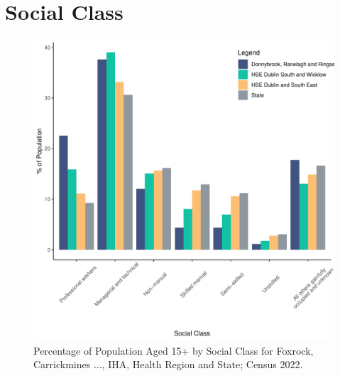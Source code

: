 \documentclass{article}
\begin{document}
\section{Social Class}\label{sect:SC}
\begin{figure}[H]
	\centering
	\includegraphics[width = 140mm]{../figures/SocialClassED.pdf}
	\caption{Percentage of Population Aged 15+ by Social Class for Foxrock, Carrickmines ..., IHA, Health Region and State; Census 2022.}
	\label{fig:vbnv}
	\end{figure}
\end{document}
